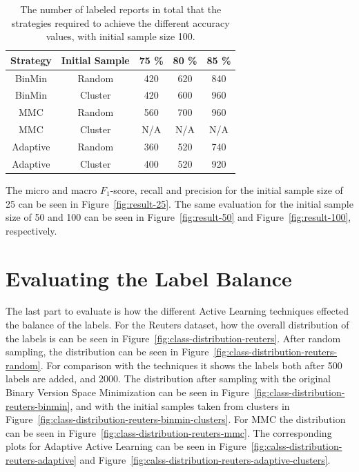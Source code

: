 \begin{table}
    \centering
    \begin{tabular}{|ccccc|}
        \hline
        \textbf{Strategy} & \textbf{Initial Sample} & \textbf{75 \%} & \textbf{80 \%} & \textbf{85 \%}\\
        \hline
        BinMin & Random & 420 & 620 & 840\\
        BinMin & Cluster & 420 & 600 & 960\\
        MMC & Random & 560 & 700 & 960\\
        MMC & Cluster & N/A & N/A & N/A\\
        Adaptive & Random & 360 & 520 & 740\\
        Adaptive & Cluster & 400 & 520 & 920\\
        \hline
    \end{tabular}
    \caption{The number of labeled reports in total that the strategies required to achieve the different accuracy values, with initial sample size 100.}
    \label{tab:active-learning-accuracy-100}
\end{table}

The micro and macro $F_1$-score, recall and precision for the initial sample size of 25 can be seen in Figure~\ref{fig:result-25}.
The same evaluation for the initial sample size of 50 and 100 can be seen in Figure~\ref{fig:result-50} and Figure~\ref{fig:result-100}, respectively.


\section{Evaluating the Label Balance}

The last part to evaluate is how the different Active Learning techniques effected the balance of the labels.
For the Reuters dataset, how the overall distribution of the labels is can be seen in Figure~\ref{fig:class-distribution-reuters}.
After random sampling, the distribution can be seen in Figure~\ref{fig:class-distribution-reuters-random}.
For comparison with the techniques it shows the labels both after 500 labels are added, and 2000.
The distribution after sampling with the original Binary Version Space Minimization can be seen in Figure~\ref{fig:class-distribution-reuters-binmin}, and with the initial samples taken from clusters in Figure~\ref{fig:class-distribution-reuters-binmin-clusters}.
For MMC the distribution can be seen in Figure~\ref{fig:class-distribution-reuters-mmc}.
The corresponding plots for Adaptive Active Learning can be seen in Figure~\ref{fig:calss-distribution-reuters-adaptive} and Figure~\ref{fig:calss-distribution-reuters-adaptive-clusters}.

